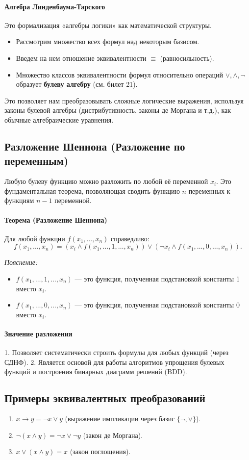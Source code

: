 \paragraph{Алгебра Линденбаума-Тарского}
Это формализация «алгебры логики» как математической структуры.
\begin{itemize}
    \item Рассмотрим множество всех формул над некоторым базисом.
    \item Введем на нем отношение эквивалентности $\equiv$ (равносильность).
    \item Множество классов эквивалентности формул относительно операций $\lor, \land, \neg$ образует \textbf{булеву алгебру} (см. билет 21).
\end{itemize}
Это позволяет нам преобразовывать сложные логические выражения, используя законы булевой алгебры (дистрибутивность, законы де Моргана и т.д.), как обычные алгебраические уравнения.

\subsection*{Разложение Шеннона (Разложение по переменным)}

Любую булеву функцию можно разложить по любой её переменной $x_i$. Это фундаментальная теорема, позволяющая сводить функцию $n$ переменных к функциям $n-1$ переменной.

\paragraph{Теорема (Разложение Шеннона)}
Для любой функции $f(x_1, \dots, x_n)$ справедливо:
$$f(x_1, \dots, x_n) = \left( x_i \land f(x_1, \dots, 1, \dots, x_n) \right) \lor \left( \neg x_i \land f(x_1, \dots, 0, \dots, x_n) \right).$$

\textit{Пояснение:}
\begin{itemize}
    \item $f(x_1, \dots, 1, \dots, x_n)$ — это функция, полученная подстановкой константы 1 вместо $x_i$.
    \item $f(x_1, \dots, 0, \dots, x_n)$ — это функция, полученная подстановкой константы 0 вместо $x_i$.
\end{itemize}

\paragraph{Значение разложения}
1. Позволяет систематически строить формулы для любых функций (через СДНФ).
2. Является основой для работы алгоритмов упрощения булевых функций и построения бинарных диаграмм решений (BDD).

\subsection*{Примеры эквивалентных преобразований}
\begin{enumerate}
    \item $x \to y = \neg x \lor y$ (выражение импликации через базис $\{\neg, \lor\}$).
    \item $\neg(x \land y) = \neg x \lor \neg y$ (закон де Моргана).
    \item $x \lor (x \land y) = x$ (закон поглощения).
\end{enumerate}